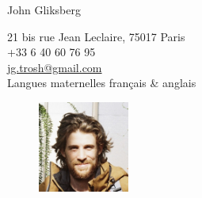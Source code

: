\documentclass[a4paper,10pt]{article}
\begin{document}

{\Large John \sc Gliksberg}
\hrulefill\\[-.47cm]
\begin{minipage}{0.8\textwidth}
\begin{flushleft}
\vspace{.5cm}
21 bis rue Jean Leclaire, 75017 Paris\\[.2cm]
+33 6 40 60 76 95\\
\href{mailto:jg.trosh@gmail.com}
{jg.trosh@gmail.com}\\[.2cm]
Langues maternelles français \& anglais\\
\end{flushleft}
\end{minipage}%
\begin{minipage}{0.2\textwidth}
\begin{figure}[H]
\begin{flushright}
\includegraphics[height=3cm]{johnpic}
\end{flushright}
\end{figure}
\end{minipage}\\

\begin{center}
\end{center}
\vspace{.3cm}

\end{document}
